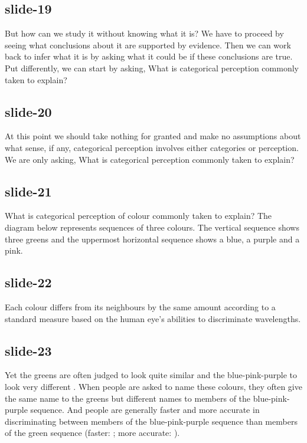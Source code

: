 \documentclass[12pt,\papersize]{extarticle}
\begin{document}
 
\subsection{slide-19}
But how can we study it without knowing what it is?
We have to proceed by seeing what conclusions about it are supported by evidence.
Then we can work back to infer what it is by asking what it could be if these conclusions are true.
Put differently, we can start by asking, What is categorical perception commonly taken to explain?
 
 
\subsection{slide-20}
At this point we should take nothing for granted and make no assumptions about what sense, if any, categorical perception involves either categories or perception.
We are only asking, What is categorical perception commonly taken to explain?
 
 
\subsection{slide-21}
What is categorical perception of colour commonly taken to explain?
The diagram below represents sequences of three colours.
The vertical sequence shows three greens and the uppermost horizontal sequence shows a blue, a purple and a pink.
 
 
\subsection{slide-22}
Each colour differs from its neighbours by the same amount according to a standard measure based on the human eye's abilities to discriminate wavelengths.
 
 
\subsection{slide-23}
Yet the greens are often judged to look quite similar and the blue-pink-purple to look very different \citep[p.\ 12--7]{Roberson:1999rk}.
When people are asked to name these colours, they often give the same name to the greens but different names to members of the blue-pink-purple sequence.
And people are generally faster and more accurate in discriminating between members of the blue-pink-purple sequence than members of the green sequence (faster: \citealp{Bornstein:1984cb}; more accurate: \citealp[p.\ 22--7]{Roberson:1999rk}).
 
\end{document}
